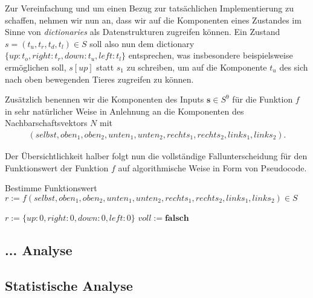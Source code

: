 Zur Vereinfachung und um einen Bezug zur tatsächlichen Implementierung zu schaffen, nehmen wir nun an, dass wir auf die Komponenten eines Zustandes im Sinne von \textit{dictionaries} als Datenstrukturen zugreifen können. Ein Zustand $s = (t_u, t_r, t_d, t_l) \in S$ soll also nun dem dictionary $\{up: t_o, right: t_r, down: t_u, left: t_l \}$ entsprechen, was insbesondere beispielsweise ermöglichen soll, $s[up]$ statt $s_1$ zu schreiben, um auf die Komponente $t_u$ des sich nach oben bewegenden Tieres zugreifen zu können.

Zusätzlich benennen wir die Komponenten des Inputs $\textbf{s} \in S^{9}$ für die Funktion $f$ in sehr natürlicher Weise in Anlehnung an die Komponenten des Nachbarschaftsvektors $N$ mit
\begin{align*}
  \left( selbst, oben_1, oben_2, unten_1, unten_2, rechts_1, rechts_2, links_1, links_2 \right).
\end{align*}

Der Übersichtlichkeit halber folgt nun die vollständige Fallunterscheidung für den Funktionswert der Funktion $f$ auf algorithmische Weise in Form von Pseudocode.

\begin{algorithm}
  \caption{Bestimme Funktionswert $r := f\left( selbst, oben_1, oben_2, unten_1, unten_2, rechts_1, rechts_2, links_1, links_2 \right) \in S$}
  \begin{algorithmic}[1]
    \State $r := \{up: 0, right: 0, down: 0, left: 0 \}$
    \State $voll := \textbf{falsch}$

        \EndIf
      \EndFor
          \Else
            \EndIf
          \EndIf
        \EndFor
      \EndIf
    \Else %



    \EndIf

    \EndProcedure
  \end{algorithmic}
\end{algorithm}


\subsection{... Analyse}


\subsection{Statistische Analyse}







